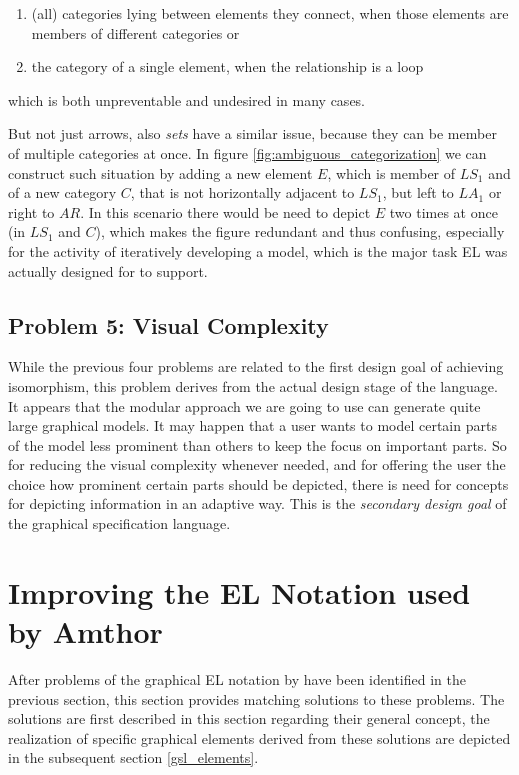 \documentclass[twoside, openright, 12pt]{book}
\begin{document}
\begin{enumerate}[label=\alph*)]
\item (all) categories lying between elements they connect, when those elements are members of different categories or 
\item the category of a single element, when the relationship is a loop
\end{enumerate}

\noindent
which is both unpreventable and undesired in many cases.

But not just arrows, also \textit{sets} have a similar issue, because they can be member of multiple categories at once.
In figure \ref{fig:ambiguous_categorization} we can construct such situation by adding a new element $E$, which is member of $\mathit{LS}_1$ and of a new category $C$, that is not horizontally adjacent to $\mathit{LS}_1$, but left to $\mathit{LA}_1$ or right to $\mathit{AR}$.
In this scenario there would be need to depict $E$ two times at once (in $\mathit{LS}_1$ and $C$), which makes the figure redundant and thus confusing, especially for the activity of iteratively developing a model, which is the major task EL was actually designed for to support.\\



\subsection{Problem 5: Visual Complexity}
\label{problem_visual_complexity}
While the previous four problems are related to the first design goal of achieving isomorphism, this problem derives from the actual design stage of the language.
It appears that the modular approach we are going to use can generate quite large graphical models.
It may happen that a user wants to model certain parts of the model less prominent than others to keep the focus on important parts.
So for reducing the visual complexity whenever needed, and for offering the user the choice how prominent certain parts should be depicted, there is need for concepts for depicting information in an adaptive way.
This is the \textit{secondary design goal} of the graphical specification language.



\section{Improving the EL Notation used by Amthor}
\label{improving_notation}
After problems of the graphical EL notation by \cite{Amthor18} have been identified in the previous section, this section provides matching solutions to these problems.
The solutions are first described in this section regarding their general concept, the realization of specific graphical elements derived from these solutions are depicted in the subsequent section \ref{gsl_elements}.
\end{document}
